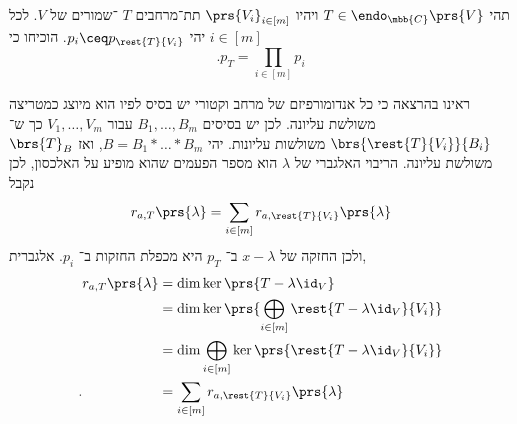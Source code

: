 \documentclass[a4paper,10pt,oneside,openany]{article}
\begin{document}
\begin{exercise}
תהי
$T \in \endo_{\mbb{C}}\prs{V}$
ויהיו
$\prs{V_i}_{i \in [m]}$
תת־מרחבים
$T$%
־שמורים של
$V$.
לכל
$i \in [m]$
יהי
$p_i \ceq p_{\rest{T}{V_i}}$.
הוכיחו כי
\[\text{.} p_T = \prod_{i \in [m]} p_i\]
\end{exercise}

\begin{solution}
ראינו בהרצאה כי כל אנדומורפיזם של מרחב וקטורי יש בסיס לפיו הוא מיוצג כמטריצה משולשת עליונה. לכן יש בסיסים
$B_1, \ldots, B_m$
עבור
$V_1, \ldots, V_m$
כך ש־%
$\brs{\rest{T}{V_i}}{B_i}$
משולשות עליונות.
יהי
$B = B_1 * \ldots * B_m$,
ואז
$\brs{T}_B$
משולשת עליונה.
הריבוי האלגברי של
$\lambda$
הוא מספר הפעמים שהוא מופיע על האלכסון, לכן נקבל
\begin{align*}
r_{a,T}\prs{\lambda} = \sum_{i \in [m]} r_{a,\rest{T}{V_i}}\prs{\lambda}
\end{align*}
ולכן החזקה של
$x-\lambda$
ב־%
$p_T$
היא מכפלת החזקות ב־%
$p_i$.
אלגברית,
\begin{align*}
r_{a,T}\prs{\lambda} &= \dim \ker \prs{T - \lambda \id_V}
\\&= \dim \ker \prs{\bigoplus_{i \in [m]} \rest{T - \lambda \id_V}{V_i}}
\\&= \dim \bigoplus_{i \in [m]} \ker\prs{\rest{T - \lambda \id_V}{V_i}}
\\ \text{.} \hphantom{r_{a,T}\prs{\lambda}} &= \sum_{i \in [m]} r_{a,\rest{T}{V_i}}\prs{\lambda}
\end{align*}
\end{solution}
\end{document}
